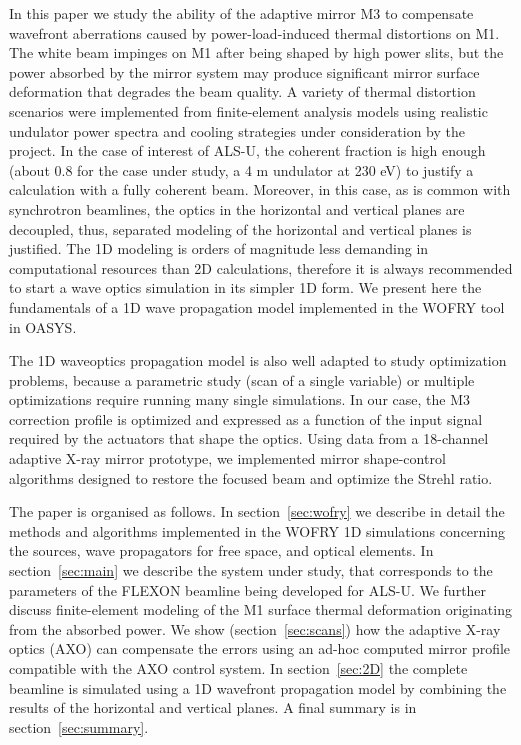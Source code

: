 \documentclass{iucr}
\begin{document}
In this paper we study the ability of the adaptive mirror M3 to compensate wavefront aberrations caused by power-load-induced thermal distortions on M1. The white beam impinges on M1 after being shaped by high power slits, but the power absorbed by the mirror system may produce significant mirror surface deformation that degrades the beam quality. 
A variety of thermal distortion scenarios were implemented from finite-element analysis models using realistic undulator power spectra and cooling strategies under consideration by the project.
In the case of interest of ALS-U, the coherent fraction is high enough (about 0.8 for the case under study, a 4 m undulator at 230 eV) to justify a calculation with a fully coherent beam. Moreover, in this case, as is common with synchrotron beamlines, the optics in the horizontal and vertical planes are decoupled, thus, separated modeling of the horizontal and vertical planes is justified. The 1D modeling is orders of magnitude less demanding in computational resources than 2D calculations, therefore it is always recommended to start a wave optics simulation in its simpler 1D form. We present here the fundamentals of a 1D wave propagation model implemented in the WOFRY \cite{codeWOFRY} tool in OASYS.

The 1D waveoptics propagation model is also well adapted to study optimization problems, because a parametric study (scan of a single variable) or multiple optimizations require running many single simulations. In our case, the M3 correction profile is optimized and expressed as a function of the input signal required by the actuators that shape the optics. 
Using data from a 18-channel adaptive X-ray mirror prototype, we implemented mirror shape-control algorithms designed to restore the focused beam and optimize the Strehl ratio.

The paper is organised as follows. In section~\ref{sec:wofry} we describe in detail the methods and algorithms implemented in the WOFRY 1D simulations concerning the sources, wave propagators for free space, and optical elements. In section~\ref{sec:main} we describe the system under study, that corresponds to the parameters of the FLEXON beamline being developed for ALS-U. We further discuss finite-element modeling of the M1 surface thermal deformation originating from the absorbed power. We show (section~\ref{sec:scans}) how the adaptive X-ray optics (AXO) can compensate the errors using an ad-hoc computed mirror profile compatible with the AXO control system. In section~\ref{sec:2D} the complete beamline is simulated using a 1D wavefront propagation model by combining the results of the horizontal and vertical planes. A final summary is in section~\ref{sec:summary}.
\end{document}
